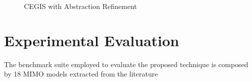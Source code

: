 \documentclass[sigconf]{llncs}
\newcommand{\jrronly}[1]{{}}
\begin{document}
\begin{figure*}[htb]
{\begin{tikzpicture}[scale=0.3,->,>=stealth',shorten >=.2pt,auto, semithick, initial text=, ampersand replacement=\&,]

 \end{tikzpicture}
}
\caption{CEGIS with Abstraction Refinement}
\label{fig:CEGARIS}
\end{figure*}

\section{Experimental Evaluation}
\label{exp:evaluation}

\jrronly{
\subsection{Description of the benchmarks}
\label{exp:benchmarks}
}

The benchmark suite employed to evaluate the proposed technique is 
composed by 18 MIMO models extracted from the literature~\cite{acrobot,cstr,CHEN1979389,KOKOTOVIC198023,gajic2008optimal,Franklin15,maglev,converters} 
\end{document}
